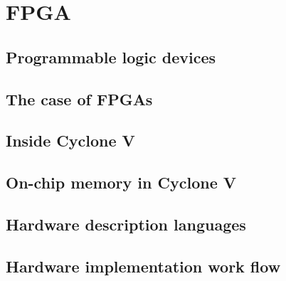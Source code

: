 \chapter{FPGA}

\section{Programmable logic devices}

\section{The case of FPGAs}

\section{Inside Cyclone V}

\section{On-chip memory in Cyclone V}

\section{Hardware description languages}

\section{Hardware implementation work flow}